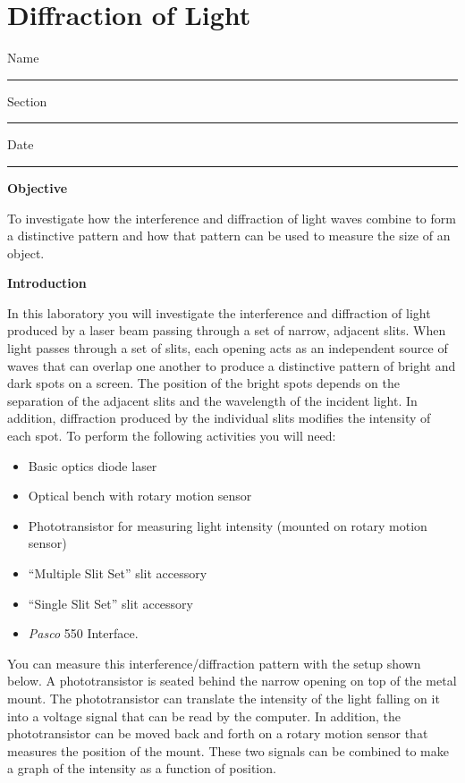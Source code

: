 
\section{Diffraction of Light}

Name \rule{2.0in}{0.1pt}\hfill{}Section \rule{1.0in}{0.1pt}\hfill{}Date
\rule{1.0in}{0.1pt}

\textbf{Objective}

To investigate how the interference and diffraction of light waves
combine to form a distinctive pattern and how that pattern can be
used to measure the size of an object.

\textbf{Introduction}

In this laboratory you will investigate the interference and diffraction
of light produced by a laser beam passing through a set of narrow,
adjacent slits. When light passes through a set of slits, each opening
acts as an independent source of waves that can overlap one another
to produce a distinctive pattern of bright and dark spots on a screen.
The position of the bright spots depends on the separation of the
adjacent slits and the wavelength of the incident light. In addition,
diffraction produced by the individual slits modifies the intensity
of each spot. To perform the following activities you will need:

\begin{itemize}
\item Basic optics diode laser
\item Optical bench with rotary motion sensor
\item Phototransistor for measuring light intensity (mounted on rotary motion sensor)
\item ``Multiple Slit Set'' slit accessory
\item ``Single Slit Set'' slit accessory
\item {\it Pasco} 550 Interface.
\end{itemize}
You can measure this interference/diffraction pattern with the setup
shown below. A phototransistor is seated behind the narrow opening on top
of the metal mount. The phototransistor can translate the intensity
of the light falling on it into a voltage signal that can be read
by the computer. In addition, the phototransistor can be moved back and
forth on a rotary motion sensor that measures the position of the 
mount.
These two signals can be combined to
make a graph of the intensity as a function of position.

